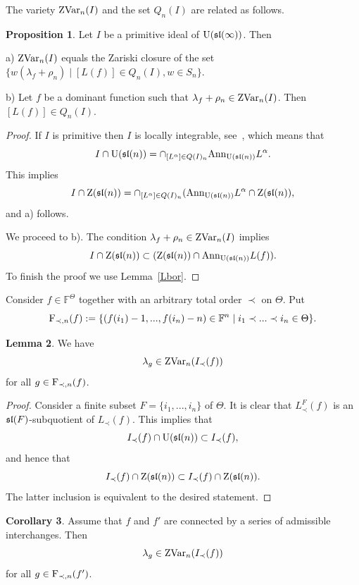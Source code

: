 \documentclass[10pt]{amsart}\oddsidemargin -1mm \evensidemargin -1mm \topmargin -15mm\headheight5mm \headsep 3.5mm \textheight 245mm\textwidth 170mm
\theoremstyle{definition}\newtheorem{theorem}{Theorem}[section]\newtheorem{lemma}[theorem]{Lemma}\newtheorem{remark}[theorem]{Remark}\newtheorem{proposition}[theorem]{Proposition}\newtheorem{corollary}[theorem]{Corollary}\newtheorem{definition}[theorem]{Definition}\newtheorem{Ex}[theorem]{Example}\newtheorem{obs}[theorem]{Observation}\newtheorem{nota}[theorem]{Notation}
\begin{document}
The variety ${\rm ZVar}_n(I)$ and the set $Q_n(I)$ are related as follows.
\begin{proposition}\label{Pzvar} Let $I$ be a primitive ideal of ${\rm U}(\frak{sl}(\infty))$. Then

a) ${\rm ZVar}_n(I)$ equals the Zariski closure of the set $\{w(\lambda_f+\rho_n)\mid [L(f)]\in Q_n(I), w\in S_n\}$.

b) Let $f$ be a dominant function such that $\lambda_f+\rho_n\in {\rm ZVar}_n(I)$. Then $[L(f)]\in Q_n(I)$.\end{proposition}
\begin{proof} If $I$ is primitive then $I$ is locally integrable, see~\cite[Section~4]{PP5}, which means that
$$I\cap {\rm U}(\frak{sl}(n))=\cap_{[L^\alpha]\in Q(I)_n}{\rm Ann}_{{\rm U}(\frak{sl}(n))} L^\alpha.$$
This implies 
$$I\cap {\rm Z}(\frak{sl}(n))=\cap_{[L^\alpha]\in Q(I)_n}({\rm Ann}_{{\rm U}(\frak{sl}(n))} L^\alpha\cap {\rm Z}(\frak{sl}(n)),$$
and a) follows.

We proceed to b).  
The condition $\lambda_f+\rho_n\in {\rm ZVar}_n(I)$ implies $$I\cap{\rm Z}(\frak{sl}(n))\subset ({\rm Z}(\frak{sl}(n))\cap{\rm Ann}_{{\rm U}(\frak{sl}(n))}L(f)).$$
To finish the proof we use Lemma~\ref{Lbor}.%
\end{proof}

Consider $f\in\mathbb F^{\Theta}$ together with an arbitrary total order $\prec$ on $\Theta$. 
Put
$${\rm F}_{\prec, n}(f):=\{(f(i_1)-1,..., f(i_n)-n)\in\mathbb F^n\mid i_1\prec ...\prec  i_n\in\Theta\}.$$
\begin{lemma}\label{Ltop} We have
$$\lambda_g\in{\rm ZVar}_n(I_\prec(f))$$
for all $g\in{\rm F}_{\prec, n}(f)$.
\end{lemma}
\begin{proof} Consider a finite subset $F=\{i_1,..., i_n\}$ of $\Theta$. 
It is clear that $L_\prec^F(f)$ is an $\frak{sl}(F)$-subquotient of $L_\prec(f)$. 
This implies that $$I_\prec(f)\cap{\rm U}(\frak{sl}(n))\subset I_\prec(f),$$
and hence that
$$I_\prec(f)\cap{\rm Z}(\frak{sl}(n))\subset I_\prec(f)\cap{\rm Z}(\frak{sl}(n)).$$
The latter inclusion is equivalent to the desired statement.
\end{proof}
\begin{corollary}\label{Clam} Assume that $f$ and $f'$ are connected by a series of admissible interchanges. 
Then
$$\lambda_g\in{\rm ZVar}_n(I_\prec(f))$$
for all $g\in{\rm F}_{\prec, n}(f')$.
\end{corollary}
\end{document}
